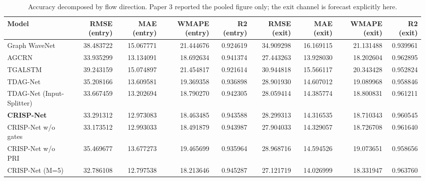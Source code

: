\begin{table}[!t]
\caption{Accuracy decomposed by flow direction. Paper 3 reported the pooled figure only; the exit channel is forecast explicitly here.}
\label{tab:per_channel}
\centering
\footnotesize
\begin{tabular}{lrrrrrrrr}
\toprule
Model & RMSE (entry) & MAE (entry) & WMAPE (entry) & R2 (entry) & RMSE (exit) & MAE (exit) & WMAPE (exit) & R2 (exit) \\
\midrule
Graph WaveNet & 38.483722 & 15.067771 & 21.444676 & 0.924619 & 34.909298 & 16.169115 & 21.131488 & 0.939961 \\
AGCRN & 33.935299 & 13.134091 & 18.692634 & 0.941374 & 27.443263 & 13.928030 & 18.202604 & 0.962895 \\
TGALSTM & 39.243159 & 15.074897 & 21.454817 & 0.921614 & 30.944818 & 15.566117 & 20.343428 & 0.952824 \\
TDAG-Net & 35.208166 & 13.609581 & 19.369358 & 0.936898 & 28.901930 & 14.607012 & 19.089968 & 0.958846 \\
TDAG-Net (Input-Splitter) & 33.667459 & 13.202694 & 18.790270 & 0.942305 & 28.059414 & 14.385774 & 18.800831 & 0.961211 \\
\textbf{CRISP-Net} & 33.291312 & 12.973083 & 18.463485 & 0.943588 & 28.299313 & 14.316535 & 18.710343 & 0.960545 \\
CRISP-Net w/o gates & 33.173512 & 12.993033 & 18.491879 & 0.943987 & 27.904033 & 14.329057 & 18.726708 & 0.961640 \\
CRISP-Net w/o PRI & 35.469677 & 13.677273 & 19.465699 & 0.935964 & 28.968716 & 14.594526 & 19.073651 & 0.958656 \\
CRISP-Net (M=5) & 32.786108 & 12.797538 & 18.213646 & 0.945287 & 27.121719 & 14.026999 & 18.331947 & 0.963760 \\
\bottomrule
\end{tabular}
\end{table}

